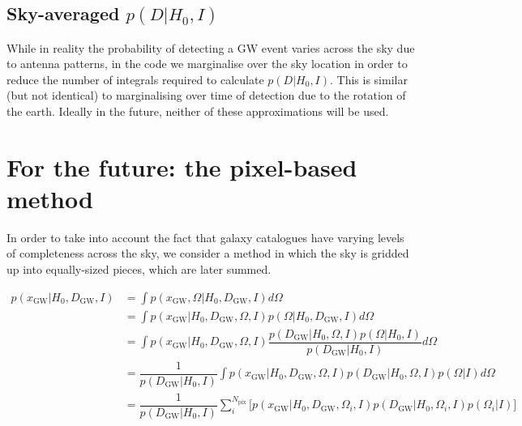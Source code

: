 \documentclass[a4paper,10pt]{article}
\begin{document}
\subsection{Sky-averaged $p(D|H_0,I)$}
While in reality the probability of detecting a GW event varies across the sky due to antenna patterns, in the code we marginalise over the sky location in order to reduce the number of integrals required to calculate $p(D|H_0,I)$.  This is similar (but not identical) to marginalising over time of detection due to the rotation of the earth.  Ideally in the future, neither of these approximations will be used.




\section{For the future: the pixel-based method \label{Sec: Future}}
In order to take into account the fact that galaxy catalogues have varying levels of completeness across the sky, we consider a method in which the sky is gridded up into equally-sized pieces, which are later summed.

\begin{equation}
\begin{aligned}
p(x_{\text{GW}}|H_0,D_{\text{GW}},I) &= \int p(x_{\text{GW}},\Omega|H_0,D_{\text{GW}},I) d\Omega
\\ & = \int p(x_{\text{GW}}|H_0,D_{\text{GW}},\Omega,I) p(\Omega|H_0,D_{\text{GW}},I) d\Omega
\\ & = \int p(x_{\text{GW}}|H_0,D_{\text{GW}},\Omega,I) \dfrac{p(D_{\text{GW}}|H_0,\Omega,I)p(\Omega|H_0,I)}{p(D_{\text{GW}}|H_0,I)}  d\Omega
\\ &= \dfrac{1}{p(D_{\text{GW}}|H_0,I)} \int p(x_{\text{GW}}|H_0,D_{\text{GW}},\Omega,I) p(D_{\text{GW}}|H_0,\Omega,I)p(\Omega|I) d\Omega
\\ &= \dfrac{1}{p(D_{\text{GW}}|H_0,I)} \sum^{N_{\text{pix}}}_i \bigg[p(x_{\text{GW}}|H_0,D_{\text{GW}},\Omega_i,I) p(D_{\text{GW}}|H_0,\Omega_i,I)p(\Omega_i|I)\bigg]
\end{aligned} 
\end{equation}
\end{document}
